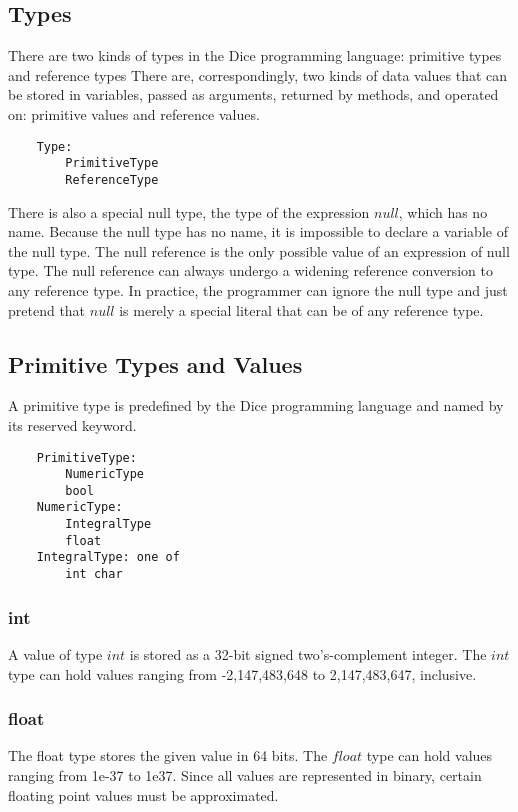 \begin{homeworkProblem}
	\chapter{Types}
    There are two kinds of types in the Dice programming language: primitive types and reference types  There are, correspondingly, two kinds of data values that can be stored in variables, passed as arguments, returned by methods, and operated on: primitive values and reference values.\\
	\begin{verbatim}
    Type:
        PrimitiveType
        ReferenceType
    \end{verbatim}
    There is also a special null type, the type of the expression $null$, which has no name. Because the null type has no name, it is impossible to declare a variable of the null type. The null reference is the only possible value of an expression of null type. The null reference can always undergo a widening reference conversion to any reference type. In practice, the programmer can ignore the null type and just pretend that $null$ is merely a special literal that can be of any reference type.\\

	\section{Primitive Types and Values}
    A primitive type is predefined by the Dice programming language and named by its reserved keyword.
    \begin{verbatim}
    PrimitiveType:
        NumericType
        bool
    NumericType:
        IntegralType
        float
    IntegralType: one of
        int char
    \end{verbatim}
    
    \subsection{int}
	A value of type $int$ is stored as a 32-bit signed two's-complement integer. The $int$ type can hold values ranging from -2,147,483,648 to 2,147,483,647, inclusive.

	\subsection{float}

	The float type stores the given value in 64 bits. The $float$ type can hold values ranging from 1e-37 to 1e37. Since all values are represented in binary, certain floating point values must be approximated.


\end{homeworkProblem}
